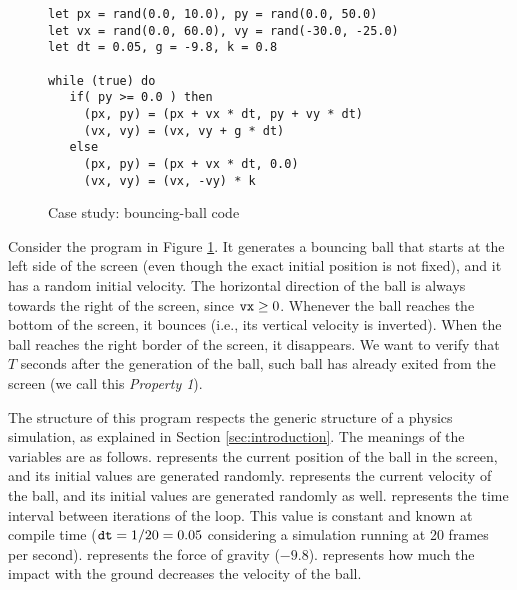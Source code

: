 \begin{figure}[b]
\vspace{-15pt}
\begin{lstlisting}
let px = rand(0.0, 10.0), py = rand(0.0, 50.0)
let vx = rand(0.0, 60.0), vy = rand(-30.0, -25.0)
let dt = 0.05, g = -9.8, k = 0.8

while (true) do
   if( py >= 0.0 ) then 
     (px, py) = (px + vx * dt, py + vy * dt)
     (vx, vy) = (vx, vy + g * dt)
   else
     (px, py) = (px + vx * dt, 0.0)
     (vx, vy) = (vx, -vy) * k
\end{lstlisting}
\caption{Case study: bouncing-ball code}
\label{lst:casestudy}
\end{figure}

Consider the program in Figure \ref{lst:casestudy}. It generates a bouncing ball that starts at the left side of the screen (even though the exact initial position is not fixed), and it has a random initial velocity. The horizontal direction of the ball is always towards the right of the screen, since $\mathtt{vx} \geq 0$.%
Whenever the ball reaches the bottom of the screen, it bounces (i.e., its vertical velocity is inverted). When the ball reaches the right border of the screen, it disappears. We want to verify that $T$ seconds after the generation of the ball, such ball has already exited from the screen (we call this \emph{Property 1}). 

The structure of this program respects the generic structure of a physics simulation, as explained in Section \ref{sec:introduction}. The meanings of the variables are as follows.  represents the current position of the ball in the screen, and its initial values are generated randomly.  represents the current velocity of the ball, and its initial values are generated randomly as well.  represents the time interval between iterations of the loop. This value is constant and known at compile time ($\mathtt{dt}=1/20=0.05$ considering a simulation running at 20 frames per second).  represents the force of gravity ($-9.8$).  represents how much the impact with the ground decreases the velocity of the ball.

